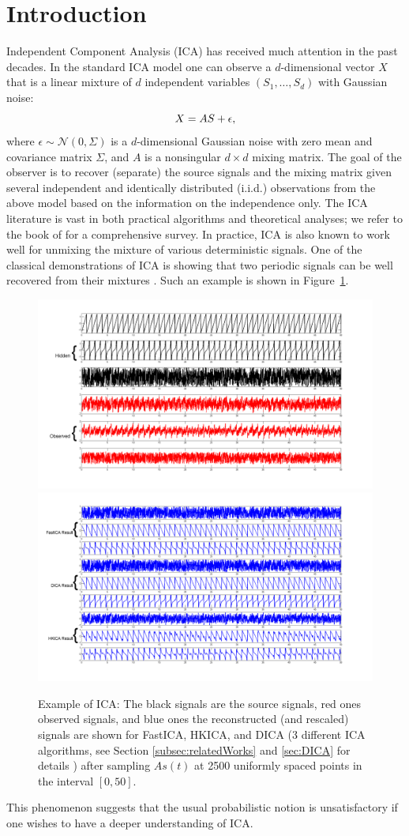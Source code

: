 \documentclass{article} %
\newcommand{\iid}{i.i.d.\xspace}
\theoremstyle{definition}
\begin{document}
\section{Introduction}
Independent Component Analysis (ICA)
has received much attention in the past decades. 
In the standard ICA model one can observe a $d$-dimensional vector $X$ that is a linear mixture of $d$ independent variables $(S_1,\ldots, S_d)$ with Gaussian noise:
\vspace{-2mm}
\begin{equation}
\label{eq:stoch-ICA}
X = AS+\epsilon,
\vspace{-2mm}
\end{equation}
where $\epsilon \sim \mathcal{N}(0,\Sigma)$ is a $d$-dimensional Gaussian noise with zero mean and covariance matrix $\Sigma$, and $A$ is a nonsingular $d \times d$ mixing matrix. 
The goal of the observer is to recover (separate) the source signals and the mixing matrix given several independent and identically distributed (\iid) observations from the above model based on the information on the independence only.
The ICA literature is vast in both practical algorithms and theoretical analyses; 
we refer to the book of \citet{comon2010handbook} for a comprehensive survey.
In practice, ICA is also known to work well for unmixing the mixture of various deterministic signals. 
One of the classical demonstrations of ICA is showing that two periodic signals can be well recovered from their mixtures \citep{HyvOja00}.
Such an example is shown in Figure~\ref{fig:demo}. 
\begin{figure}[h]
\label{fig:demo}
\centering
	\includegraphics[width = 0.49\linewidth]{demo_source}
	\includegraphics[width = 0.49\linewidth]{demo_res}
	\vspace{-4mm}
\caption{Example of ICA: The black signals are the source signals, red ones observed signals, and blue ones the reconstructed (and rescaled) signals are shown for FastICA, HKICA, and DICA (3 different ICA algorithms, see Section \ref{subsec:relatedWorks} and \ref{sec:DICA} for details ) after sampling $As(t)$ at 2500 uniformly spaced points in the interval $[0,50]$.}
\vspace{-5mm}
\end{figure}
This phenomenon suggests that the usual probabilistic notion is unsatisfactory if one wishes to have a deeper understanding of ICA.  
\end{document}
